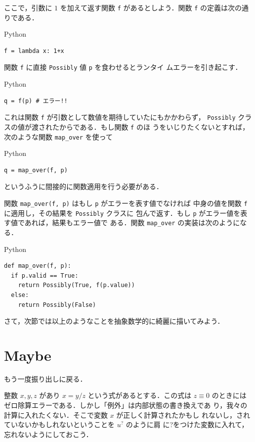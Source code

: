 \documentclass[a5paper,twoside,fleqn,draft]{jsbook}
\newcommand{\programminglanguage}[1]{\textsf{#1}}
\newcommand{\python}{\programminglanguage{Python}}
\newcommand{\code}[1]{\texttt{#1}}
\newenvironment{pythoncode}{\begin{itembox}[r]{\python}}{\end{itembox}}
\newcommand{\mMaybe}[1]{{#1}^?}
\begin{document}
ここで，引数に $1$ を加えて返す関数 \code{f} があるとしよう．関数
\code{f} の定義は次の通りである．
\begin{pythoncode}
\begin{verbatim}
f = lambda x: 1+x
\end{verbatim}
\end{pythoncode}

関数 \code{f} に直接 \code{Possibly} 値 \code{p} を食わせるとランタイ
ムエラーを引き起こす．
\begin{pythoncode}
\begin{verbatim}
q = f(p) # エラー!!
\end{verbatim}
\end{pythoncode}
これは関数 \code{f} が引数として数値を期待していたにもかかわらず，
\code{Possibly} クラスの値が渡されたからである．もし関数 \code{f} のほ
うをいじりたくないとすれば，次のような関数 \code{map\_over} を使って
\begin{pythoncode}
\begin{verbatim}
q = map_over(f, p)
\end{verbatim}
\end{pythoncode}
というふうに間接的に関数適用を行う必要がある．

関数 \code{map\_over(f, p)} はもし \code{p} がエラーを表す値でなければ
中身の値を関数 \code{f} に適用し，その結果を \code{Possibly} クラスに
包んで返す．もし \code{p} がエラー値を表す値であれば，結果もエラー値で
ある．関数 \code{map\_over} の実装は次のようになる．
\begin{pythoncode}
\begin{verbatim}
def map_over(f, p):
  if p.valid == True:
    return Possibly(True, f(p.value))
  else:
    return Possibly(False)
\end{verbatim}
\end{pythoncode}

さて，次節では以上のようなことを抽象数学的に綺麗に描いてみよう．

\section{Maybe}

もう一度振り出しに戻る．

整数 $x,y,z$ があり $x=y/z$ という式があるとする．この式は $z\equiv0$
のときにはゼロ除算エラーである．しかし「例外」は内部状態の書き換えであ
り，我々の計算に入れたくない．そこで変数 $x$ が正しく計算されたかもし
れないし，されていないかもしれないということを $\mMaybe{u}$ のように肩
に?をつけた変数に入れて，忘れないようにしておこう．
\end{document}
